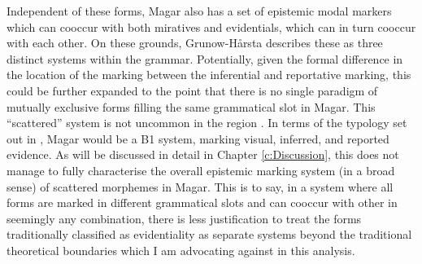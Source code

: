 Independent of these forms, Magar also has a set of epistemic modal markers which can cooccur with both miratives and evidentials, which can in turn cooccur with each other. On these grounds, Grunow-Hårsta describes these as three distinct systems within the grammar. Potentially, given the formal difference in the location of the marking between the inferential and reportative marking, this could be further expanded to the point that there is no single paradigm of mutually exclusive forms filling the same grammatical slot in Magar. This ``scattered'' system is not uncommon in the region \cite[480-481]{GrunowHarsta2008}. In terms of the typology set out in \cite{Aikhenvald2004}, Magar would be a B1 system, marking visual, inferred, and reported evidence. As will be discussed in detail in Chapter \ref{c:Discussion}, this does not manage to fully characterise the overall epistemic marking system (in a broad sense) of scattered morphemes in Magar. This is to say, in a system where all forms are marked in different grammatical slots and can cooccur with other in seemingly any combination, there is less justification to treat the forms traditionally classified as evidentiality as separate systems beyond the traditional theoretical boundaries which I am advocating against in this analysis.


